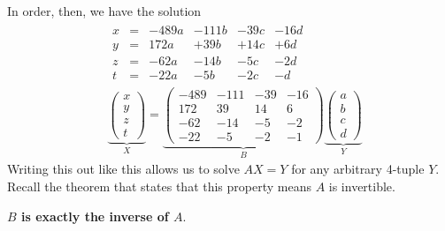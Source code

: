 \documentclass[usenames,dvipsnames,aspectratio=169,10pt]{beamer}
\numberwithin{equation}{section}
\begin{document}



\begin{frame}
In order, then, we have the solution
\begin{align*}
&
\begin{array}{rlrrrr}
   x &=& -489a & -111b & -39c & -16d \\
   y &=&  172a &  +39b & +14c &  +6d \\
   z &=&  -62a &  -14b &  -5c &  -2d \\
   t &=&  -22a &   -5b &  -2c &   -d
\end{array}
\\
&
\underbrace{
\begin{pmatrix}
   x \\
   y \\
   z \\
   t
\end{pmatrix}
}_{X}
=
\underbrace{
\begin{pmatrix}
   -489 & -111 & -39 & -16 \\
    172 &   39 &  14 &   6 \\
    -62 &  -14 &  -5 &  -2 \\
    -22 &   -5 &  -2 &  -1
\end{pmatrix}
}_{B}
\underbrace{
\begin{pmatrix}
   a \\
   b \\
   c \\
   d
\end{pmatrix}
}_{Y}
\end{align*}
Writing this out like this allows us to solve $AX=Y$ for any arbitrary 4-tuple $Y$. Recall the theorem that states that this property means $A$ is invertible.

\textbf{$B$ is exactly the inverse of $A$}.
\end{frame}
\end{document}
